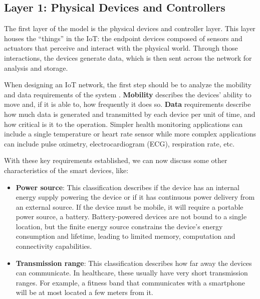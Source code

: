 \subsection{Layer 1: Physical Devices and Controllers}
\label{sec:iot-model-layer1}

The first layer of the model is the physical devices and controller layer. This layer houses the ``things'' in the \acl{IoT}: the endpoint devices composed of sensors and actuators that perceive and interact with the physical world. Through those interactions, the devices generate data, which is then sent across the network for analysis and storage. \bigskip

When designing an \acs {IoT} network, the first step should be to analyze the mobility and data requirements of the system \cite{10.5555/3161403}. \textbf{Mobility} describes the devices' ability to move and, if it is able to, how frequently it does so. \textbf{Data} requirements describe how much data is generated and transmitted by each device per unit of time, and how critical is it to the operation. Simpler health monitoring applications can include a single temperature or heart rate sensor while more complex applications can include pulse oximetry, electrocardiogram (\acs{ECG}), respiration rate, etc. \bigskip

With these key requirements established, we can now discuss some other characteristics of the smart devices, like:

\begin{itemize}
    \item \textbf{Power source}: This classification describes if the device has an internal energy supply powering the device or if it has continuous power delivery from an external source. If the device must be mobile, it will require a portable power source, a battery. Battery-powered devices are not bound to a single location, but the finite energy source constrains the device's energy consumption and lifetime, leading to limited memory, computation and connectivity capabilities. 
    \item \textbf{Transmission range}: This classification describes how far away the devices can communicate. In healthcare, these usually have very short transmission ranges. For example, a fitness band that communicates with a smartphone will be at most located a few meters from it.
\end{itemize}

